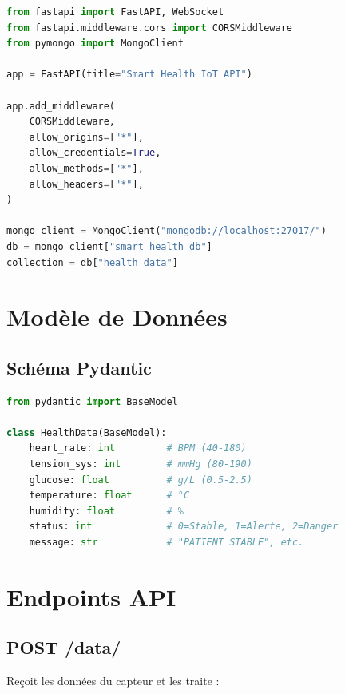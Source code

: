 \documentclass[12pt,french]{report}
\begin{document}
\begin{lstlisting}[language=Python, caption=Configuration du backend]
from fastapi import FastAPI, WebSocket
from fastapi.middleware.cors import CORSMiddleware
from pymongo import MongoClient

app = FastAPI(title="Smart Health IoT API")

app.add_middleware(
    CORSMiddleware,
    allow_origins=["*"],
    allow_credentials=True,
    allow_methods=["*"],
    allow_headers=["*"],
)

mongo_client = MongoClient("mongodb://localhost:27017/")
db = mongo_client["smart_health_db"]
collection = db["health_data"]
\end{lstlisting}

\section{Modèle de Données}

\subsection{Schéma Pydantic}

\begin{lstlisting}[language=Python, caption=Validation des données]
from pydantic import BaseModel

class HealthData(BaseModel):
    heart_rate: int         # BPM (40-180)
    tension_sys: int        # mmHg (80-190)
    glucose: float          # g/L (0.5-2.5)
    temperature: float      # °C
    humidity: float         # %
    status: int             # 0=Stable, 1=Alerte, 2=Danger
    message: str            # "PATIENT STABLE", etc.
\end{lstlisting}

\section{Endpoints API}

\subsection{POST /data/}

Reçoit les données du capteur et les traite :
\end{document}
